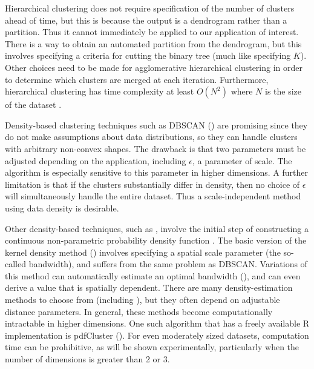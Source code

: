 \documentclass[10pt]{article}
\begin{document}
Hierarchical clustering \cite[Ch.~14]{zaki-book} does not require specification of the number of clusters ahead of time, but this is because the output is a dendrogram rather than a partition. Thus it cannot immediately be applied to our application of interest. There is a way to obtain an automated partition from the dendrogram, but this involves specifying a criteria for cutting the binary tree (much like specifying $K$). Other choices need to be made for agglomerative hierarchical clustering in order to determine which clusters are merged at each iteration. Furthermore, hierarchical clustering has time complexity at least $O(N^2)$ where $N$ is the size of the dataset \cite[Sec.~14.2.3]{zaki-book}.

Density-based clustering techniques such as DBSCAN (\cite{dbscan}) are promising since they do not make assumptions about
data distributions, %
so they can handle clusters with arbitrary non-convex shapes. The drawback is that two parameters must be adjusted depending on the application, including $\epsilon$, a parameter of scale. The algorithm is especially sensitive to this parameter in higher dimensions. A further limitation is that if the clusters
substantially differ in density, then no choice of $\epsilon$ will simultaneously handle the entire dataset. Thus a scale-independent method using data density is desirable.

Other density-based techniques, such as \cite{mean-shift}, involve the initial step of constructing a continuous non-parametric probability density function \cite[Ch.~15]{zaki-book}. The basic version of the kernel density method (\cite{kernel-density-function-1,kernel-density-function-2}) involves specifying a spatial scale parameter (the so-called bandwidth), and suffers from the same problem as DBSCAN. Variations of this method can automatically estimate an optimal bandwidth (\cite{silverman-density-estimation}), and can even derive a value that is spatially dependent. There are many density-estimation methods to choose from (including \cite{rodriguez-clustering}), but they often depend on adjustable distance parameters.
In general, these methods become computationally intractable in higher dimensions. One such algorithm that has a freely available R implementation is pdfCluster (\cite{pdfcluster}). For even moderately sized datasets, computation time can be prohibitive, as will be shown experimentally, particularly when the number of dimensions is greater than 2 or 3.
\end{document}
